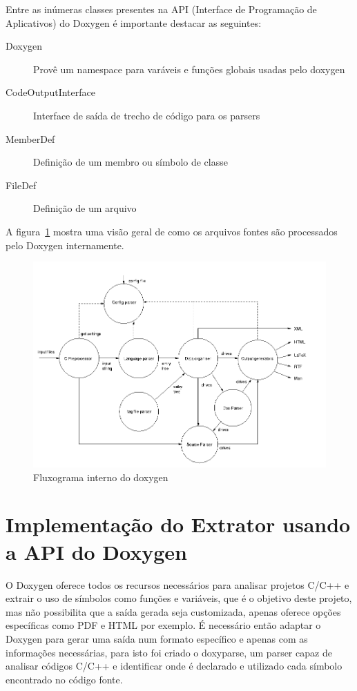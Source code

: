 Entre as inúmeras classes presentes na API (Interface de Programação de Aplicativos) do Doxygen é importante
destacar as seguintes:

\begin{description}
\item[Doxygen] Provê um namespace para varáveis e funções globais usadas pelo doxygen
\item[CodeOutputInterface] Interface de saída de trecho de código para os parsers
\item[MemberDef] Definição de um membro ou símbolo de classe
\item[FileDef] Definição de um arquivo
\end{description}

A figura~\ref{fig:doxygen-internals-flow} mostra uma visão geral de como os
arquivos fontes são processados pelo Doxygen internamente.

\begin{figure}[h]
\center
\includegraphics[scale=0.5]{imagens/doxygen-internals-flow}
\caption{Fluxograma interno do doxygen\cite{doxygenInternals}}
\label{fig:doxygen-internals-flow}
\end{figure}

\section{Implementação do Extrator usando a API do Doxygen}

O Doxygen oferece todos os recursos necessários para analisar projetos C/C++ e
extrair o uso de símbolos como funções e variáveis, que é o objetivo deste
projeto, mas não possibilita que a saída gerada seja customizada, apenas
oferece opções específicas como PDF e HTML por exemplo. É necessário então
adaptar o Doxygen para gerar uma saída num formato específico e apenas com as
informações necessárias, para isto foi criado o doxyparse, um parser capaz de
analisar códigos C/C++ e identificar onde é declarado e utilizado cada símbolo
encontrado no código fonte.

